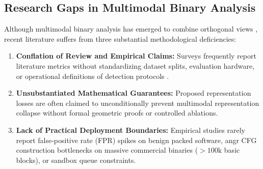 \documentclass[pdflatex,sn-mathphys-num]{sn-jnl}
\begin{document}
\subsection{Research Gaps in Multimodal Binary Analysis}\label{sec:intro_gaps}
Although multimodal binary analysis has emerged to combine orthogonal views \cite{FewMHGCL2023,BinCola2024,Baltrusaitis2019,LeKhac2020}, recent literature suffers from three substantial methodological deficiencies:
\begin{enumerate}
    \item \textbf{Conflation of Review and Empirical Claims:} Surveys frequently report literature metrics without standardizing dataset splits, evaluation hardware, or operational definitions of detection protocols \cite{Shaukat2020,Liu2022Android}.
    \item \textbf{Unsubstantiated Mathematical Guarantees:} Proposed representation losses are often claimed to unconditionally prevent multimodal representation collapse without formal geometric proofs or controlled ablations.
    \item \textbf{Lack of Practical Deployment Boundaries:} Empirical studies rarely report false-positive rate (FPR) spikes on benign packed software, angr CFG construction bottlenecks on massive commercial binaries ($>100\text{k}$ basic blocks), or sandbox queue constraints.
\end{enumerate}
\end{document}
